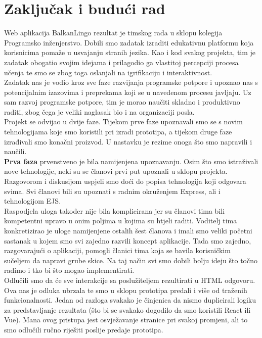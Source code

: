 \chapter{Zaključak i budući rad}
		
		Web aplikacija BalkanLingo rezultat je timskog rada u sklopu kolegija Programsko inženjerstvo. Dobili smo zadatak izraditi edukativnu platformu koja korisnicima pomaže u usvajanju stranih jezika. Kao i kod svakog projekta, tim je zadatak obogatio svojim idejama i prilagodio ga vlastitoj percepciji procesa učenja te smo se zbog toga oslanjali na igrifikaciju i interaktivnost.
		\newline
		\\
		Zadatak nas je vodio kroz sve faze razvijanja programske potpore i upoznao nas s potencijalnim izazovima i preprekama koji se u navedenom procesu javljaju. Uz sam razvoj programske potpore, tim je morao naučiti skladno i produktivno raditi, zbog čega je veliki naglasak bio i na organizaciji posla.
		\newline
		\\
		Projekt se odvijao u dvije faze. Tijekom prve faze upoznavali smo se s novim tehnologijama koje smo koristili pri izradi prototipa, a tijekom druge faze izrađivali smo konačni proizvod. U nastavku je rezime onoga što smo napravili i naučili.
		\newline
		\\
		\textbf{Prva faza} prvenstveno je bila namijenjena upoznavanju. Osim što smo istraživali nove tehnologije, neki su se članovi prvi put upoznali u sklopu projekta. Razgovorom i diskusijom uspjeli smo doći do popisa tehnologija koji odgovara svima. Svi članovi bili su upoznati s radnim okruženjem Express, ali i tehnologijom EJS. 
		\newline
		\\
		Raspodjela uloga također nije bila komplicirana jer su članovi tima bili kompetentni upravo u onim poljima u kojima su htjeli raditi. Voditelj tima konkretizirao je uloge namijenjene ostalih šest članova i imali smo veliki početni sastanak u kojem smo svi zajedno razvili koncept aplikacije. Tada smo zajedno, razgovarajući o aplikaciji, pomogli članici tima koja se bavila korisničkim sučeljem da napravi grube skice. Na taj način svi smo dobili bolju ideju što točno radimo i tko bi što mogao implementirati.
		\newline
		\\
		Odlučili smo da će sve interakcije sa poslužiteljem rezultirati u HTML odgovoru. Ova nas je odluka ubrzala te smo u sklopu prototipa predali i više od traženih funkcionalnosti. Jedan od razloga svakako je činjenica da nismo duplicirali logiku za predstavljanje rezultata (što bi se svakako dogodilo da smo koristili React ili Vue). Mana ovog pristupa jest osvježavanje stranice pri svakoj promjeni, ali to smo odlučili ručno riješiti poslije predaje prototipa.
